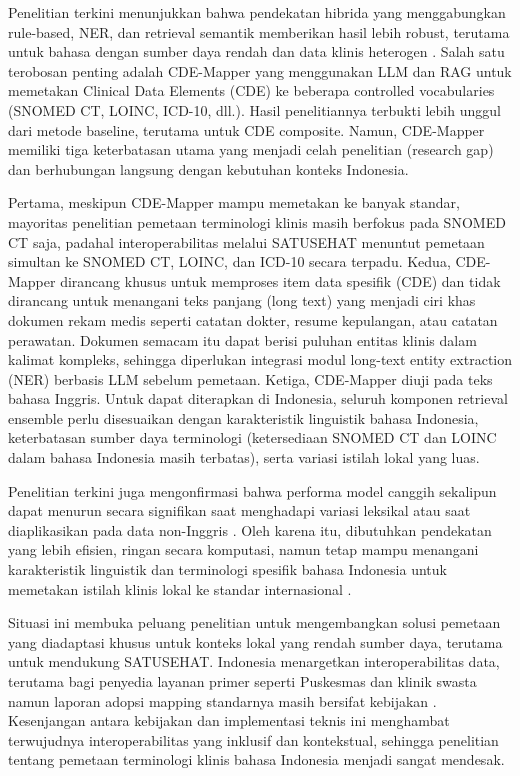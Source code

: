 Penelitian terkini menunjukkan bahwa pendekatan hibrida yang menggabungkan rule-based, NER, dan retrieval semantik memberikan hasil lebih robust, terutama untuk bahasa dengan sumber daya rendah dan data klinis heterogen \citep{chen_clinical_2020,gilani_cde-mapper_2025,pezoulas_hybrid_2021}. Salah satu terobosan penting adalah CDE-Mapper \citep{gilani_cde-mapper_2025} yang menggunakan LLM dan RAG untuk memetakan Clinical Data Elements (CDE) ke beberapa controlled vocabularies (SNOMED CT, LOINC, ICD-10, dll.). Hasil penelitiannya terbukti lebih unggul dari metode baseline, terutama untuk CDE composite. Namun, CDE-Mapper memiliki tiga keterbatasan utama yang menjadi celah penelitian (research gap) dan berhubungan langsung dengan kebutuhan konteks Indonesia.

Pertama, meskipun CDE-Mapper mampu memetakan ke banyak standar, mayoritas penelitian pemetaan terminologi klinis masih berfokus pada SNOMED CT saja, padahal interoperabilitas melalui SATUSEHAT menuntut pemetaan simultan ke SNOMED CT, LOINC, dan ICD-10 secara terpadu. Kedua, CDE-Mapper dirancang khusus untuk memproses item data spesifik (CDE) dan tidak dirancang untuk menangani teks panjang (long text) yang menjadi ciri khas dokumen rekam medis seperti catatan dokter, resume kepulangan, atau catatan perawatan. Dokumen semacam itu dapat berisi puluhan entitas klinis dalam kalimat kompleks, sehingga diperlukan integrasi modul long-text entity extraction (NER) berbasis LLM sebelum pemetaan. Ketiga, CDE-Mapper diuji pada teks bahasa Inggris. Untuk dapat diterapkan di Indonesia, seluruh komponen retrieval ensemble perlu disesuaikan dengan karakteristik linguistik bahasa Indonesia, keterbatasan sumber daya terminologi (ketersediaan SNOMED CT dan LOINC dalam bahasa Indonesia masih terbatas), serta variasi istilah lokal yang luas.

Penelitian terkini juga mengonfirmasi bahwa performa model canggih sekalipun dapat menurun secara signifikan saat menghadapi variasi leksikal atau saat diaplikasikan pada data non-Inggris \citep{gallifant_language_2024,michel-picque_classifier_2024,rouhizadeh_large_2025}. Oleh karena itu, dibutuhkan pendekatan yang lebih efisien, ringan secara komputasi, namun tetap mampu menangani karakteristik linguistik dan terminologi spesifik bahasa Indonesia untuk memetakan istilah klinis lokal ke standar internasional \citep{gehrmann_catnip_2025,huh_comparative_2025}.

Situasi ini membuka peluang penelitian untuk mengembangkan solusi pemetaan yang diadaptasi khusus untuk konteks lokal yang rendah sumber daya, terutama untuk mendukung SATUSEHAT. Indonesia menargetkan interoperabilitas data, terutama bagi penyedia layanan primer seperti Puskesmas dan klinik swasta \citep{heryawan_fast_2025} namun laporan adopsi mapping standarnya masih bersifat kebijakan \citep{ayuningtyas_bringing_2025}. Kesenjangan antara kebijakan dan implementasi teknis ini menghambat terwujudnya interoperabilitas yang inklusif dan kontekstual, sehingga penelitian tentang pemetaan terminologi klinis bahasa Indonesia menjadi sangat mendesak.

